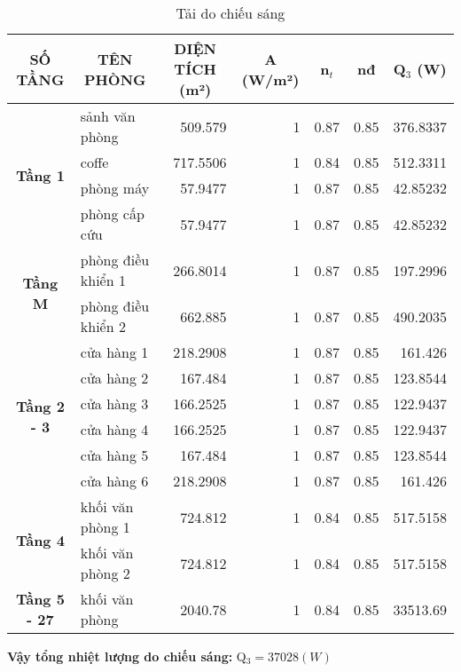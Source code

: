 \begin{table}[H]
	\centering
	\caption{Tải do chiếu sáng}
	\begin{adjustbox}{width=\textwidth, height=.2\textheight}
	\begin{tabular}{|c|l|r|r|r|r|r|}
		\hline
		\textbf{SỐ TẦNG} & \multicolumn{1}{c|}{\textbf{TÊN PHÒNG}} & \multicolumn{1}{c|}{\textbf{DIỆN TÍCH (m²) }} & \multicolumn{1}{c|}{\textbf{A (W/m²)}} & \multicolumn{1}{c|}{\textbf{n$ _{t} $}} & \multicolumn{1}{c|}{\textbf{n{\scriptsize đ}}} & \multicolumn{1}{c|}{\textbf{Q$_{3}$ (W)}} \bigstrut\\
		\hline
		\multirow{4}[8]{*}{\textbf{Tầng 1}} & sảnh văn phòng & 509.579  & 1        & 0.87     & 0.85     & 376.8337 \bigstrut\\
		\cline{2-7}             & coffe    & 717.5506 & 1        & 0.84     & 0.85     & 512.3311 \bigstrut\\
		\cline{2-7}             & phòng máy & 57.9477  & 1        & 0.87     & 0.85     & 42.85232 \bigstrut\\
		\cline{2-7}             & phòng cấp cứu & 57.9477  & 1        & 0.87     & 0.85     & 42.85232 \bigstrut\\
		\hline
		\multirow{2}[4]{*}{\textbf{Tầng M}} & phòng điều khiển 1 & 266.8014 & 1        & 0.87     & 0.85     & 197.2996 \bigstrut\\
		\cline{2-7}             & phòng điều khiển 2 & 662.885  & 1        & 0.87     & 0.85     & 490.2035 \bigstrut\\
		\hline
		\multirow{6}[12]{*}{\textbf{Tầng 2 - 3}} & cửa hàng 1 & 218.2908 & 1        & 0.87     & 0.85     & 161.426 \bigstrut\\
		\cline{2-7}             & cửa hàng 2 & 167.484  & 1        & 0.87     & 0.85     & 123.8544 \bigstrut\\
		\cline{2-7}             & cửa hàng 3 & 166.2525 & 1        & 0.87     & 0.85     & 122.9437 \bigstrut\\
		\cline{2-7}             & cửa hàng 4 & 166.2525 & 1        & 0.87     & 0.85     & 122.9437 \bigstrut\\
		\cline{2-7}             & cửa hàng 5 & 167.484  & 1        & 0.87     & 0.85     & 123.8544 \bigstrut\\
		\cline{2-7}             & cửa hàng 6 & 218.2908 & 1        & 0.87     & 0.85     & 161.426 \bigstrut\\
		\hline
		\multirow{2}[4]{*}{\textbf{Tầng 4}} & khối văn phòng 1 & 724.812  & 1        & 0.84     & 0.85     & 517.5158 \bigstrut\\
		\cline{2-7}             & khối văn phòng 2 & 724.812  & 1        & 0.84     & 0.85     & 517.5158 \bigstrut\\
		\hline
		\textbf{Tầng 5 - 27} & khối văn phòng & 2040.78  & 1        & 0.84     & 0.85     & 33513.69 \bigstrut\\
		\hline
	\end{tabular}%
	\end{adjustbox}
	\label{b:tcs}%
\end{table}%
\textbf{Vậy tổng nhiệt lượng do chiếu sáng:} Q$_{3} = 37028(W)$

